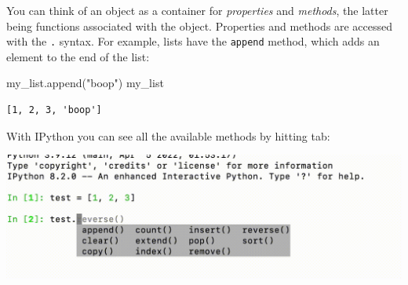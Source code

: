 \documentclass[
  letterpaper,
  DIV=11,
  numbers=noendperiod]{scrreprt}
\newenvironment{Shaded}{\begin{snugshade}}{\end{snugshade}}
\newcommand{\NormalTok}[1]{\textcolor[rgb]{0.00,0.23,0.31}{#1}}
\newcommand{\StringTok}[1]{\textcolor[rgb]{0.13,0.47,0.30}{#1}}
\theoremstyle{definition}
\theoremstyle{remark}
\begin{document}
You can think of an object as a container for \emph{properties} and
\emph{methods}, the latter being functions associated with the object.
Properties and methods are accessed with the \texttt{.} syntax. For
example, lists have the \texttt{append} method, which adds an element to
the end of the list:

\begin{Shaded}
\begin{Highlighting}[]
\NormalTok{my\_list.append(}\StringTok{"boop"}\NormalTok{)}
\NormalTok{my\_list}
\end{Highlighting}
\end{Shaded}

\begin{verbatim}
[1, 2, 3, 'boop']
\end{verbatim}

With IPython you can see all the available methods by hitting tab:

\includegraphics{./assets/tab-complete.png}
\end{document}
